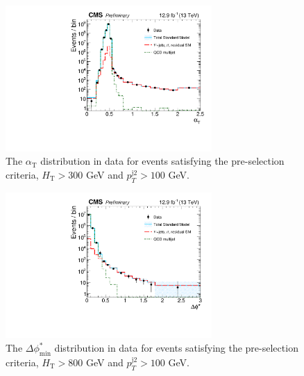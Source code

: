 \maketitle



\clearpage
\begin{figure}[tbhp]
    \caption{ 
    The $\alpha_{\mathrm{T}}$ distribution in data for events satisfying the pre-selection criteria, $H_{\mathrm{T}} > 300$ GeV and $p_{T}^{\mathrm{j2}} > 100$ GeV. 
    \label{fig:alphaT} }
  \begin{center}
  \includegraphics[width=0.7\textwidth]{figures/alphaT_160808}
  \end{center}
\end{figure}


\begin{figure}[tbhp]
    \caption{ 
    The $\Delta\phi^{*}_{\mathrm{min}}$ distribution in data for events satisfying the pre-selection criteria, $H_{\mathrm{T}} > 800$ GeV and $p_{T}^{\mathrm{j2}} > 100$ GeV. 
    \label{fig:alphaT} }
  \begin{center}
  \includegraphics[width=0.7\textwidth]{figures/bDPhi_160808}
  \end{center}
\end{figure}


